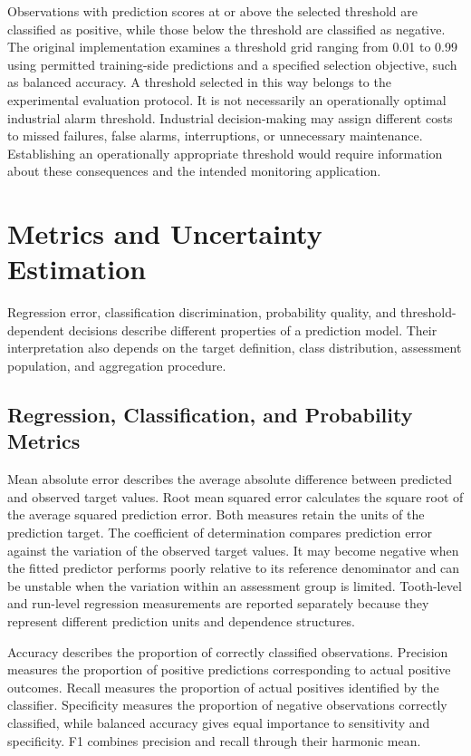 Observations with prediction scores at or above the selected threshold are classified as positive, while those below the threshold are classified as negative. The original implementation examines a threshold grid ranging from 0.01 to 0.99 using permitted training-side predictions and a specified selection objective, such as balanced accuracy. A threshold selected in this way belongs to the experimental evaluation protocol. It is not necessarily an operationally optimal industrial alarm threshold. Industrial decision-making may assign different costs to missed failures, false alarms, interruptions, or unnecessary maintenance. Establishing an operationally appropriate threshold would require information about these consequences and the intended monitoring application.

\section{Metrics and Uncertainty Estimation}
\label{sec:ch4-metrics}

Regression error, classification discrimination, probability quality, and threshold-dependent decisions describe different properties of a prediction model. Their interpretation also depends on the target definition, class distribution, assessment population, and aggregation procedure.

\subsection{Regression, Classification, and Probability Metrics}

Mean absolute error describes the average absolute difference between predicted and observed target values. Root mean squared error calculates the square root of the average squared prediction error. Both measures retain the units of the prediction target. The coefficient of determination compares prediction error against the variation of the observed target values. It may become negative when the fitted predictor performs poorly relative to its reference denominator and can be unstable when the variation within an assessment group is limited. Tooth-level and run-level regression measurements are reported separately because they represent different prediction units and dependence structures.

Accuracy describes the proportion of correctly classified observations. Precision measures the proportion of positive predictions corresponding to actual positive outcomes. Recall measures the proportion of actual positives identified by the classifier. Specificity measures the proportion of negative observations correctly classified, while balanced accuracy gives equal importance to sensitivity and specificity. F1 combines precision and recall through their harmonic mean.

